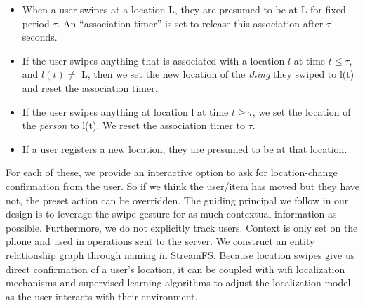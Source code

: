 \begin{itemize}
\item When a user swipes at a location L, they are presumed to be at L for fixed period $\tau$.  An ``association timer'' is set to 
        release this association after $\tau$ seconds.
\item If the user swipes anything that is associated with a location $l$ at time $t \le \tau$, and $l(t)\ne$ L, 
        then we set the new location of the \emph{thing} they swiped to l(t) and reset the association timer.
\item If the user swipes anything at location l at time $t \ge \tau$, we set the location of the \emph{person} to l(t).
        We reset the association timer to $\tau$.
\item If a user registers a new location, they are presumed to be at that location.
\end{itemize}
\vspace{0.08in}


For each of these, we provide an interactive option to ask for location-change confirmation from the user.  So if we think the
user/item has moved but they have not, the preset action can be overridden.  The guiding principal we follow in our design
is to leverage the swipe gesture for as much contextual information as possible.  Furthermore, we do not explicitly track users.
Context is only set on the phone and used in operations sent to the server.  
We construct an entity relationship graph through 
naming in StreamFS.  
Because location swipes give us direct confirmation of a user's location, it can be coupled with wifi localization mechanisms
and supervised learning algorithms to adjust the localization model as the user interacts with their environment. 

